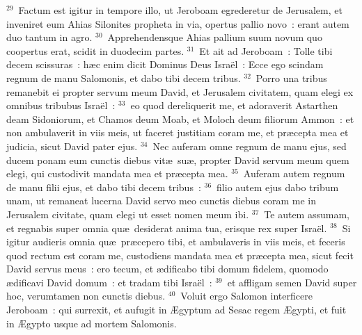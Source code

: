 ${}^{29}$~Factum est igitur in tempore illo, ut Jeroboam egrederetur de Jerusalem, et inveniret eum Ahias Silonites propheta in via, opertus pallio novo~: erant autem duo tantum in agro.
${}^{30}$~Apprehendensque Ahias pallium suum novum quo coopertus erat, scidit in duodecim partes.
${}^{31}$~Et ait ad Jeroboam~: Tolle tibi decem scissuras~: h\ae c enim dicit Dominus Deus Isra\"el~: Ecce ego scindam regnum de manu Salomonis, et dabo tibi decem tribus.
${}^{32}$~Porro una tribus remanebit ei propter servum meum David, et Jerusalem civitatem, quam elegi ex omnibus tribubus Isra\"el~:
${}^{33}$~eo quod dereliquerit me, et adoraverit Astarthen deam Sidoniorum, et Chamos deum Moab, et Moloch deum filiorum Ammon~: et non ambulaverit in viis meis, ut faceret justitiam coram me, et pr\ae cepta mea et judicia, sicut David pater ejus.
${}^{34}$~Nec auferam omne regnum de manu ejus, sed ducem ponam eum cunctis diebus vit\ae\ su\ae , propter David servum meum quem elegi, qui custodivit mandata mea et pr\ae cepta mea.
${}^{35}$~Auferam autem regnum de manu filii ejus, et dabo tibi decem tribus~:
${}^{36}$~filio autem ejus dabo tribum unam, ut remaneat lucerna David servo meo cunctis diebus coram me in Jerusalem civitate, quam elegi ut esset nomen meum ibi.
${}^{37}$~Te autem assumam, et regnabis super omnia qu\ae\ desiderat anima tua, erisque rex super Isra\"el.
${}^{38}$~Si igitur audieris omnia qu\ae\ pr\ae cepero tibi, et ambulaveris in viis meis, et feceris quod rectum est coram me, custodiens mandata mea et pr\ae cepta mea, sicut fecit David servus meus~: ero tecum, et \ae dificabo tibi domum fidelem, quomodo \ae dificavi David domum~: et tradam tibi Isra\"el~:
${}^{39}$~et affligam semen David super hoc, verumtamen non cunctis diebus.
${}^{40}$~Voluit ergo Salomon interficere Jeroboam~: qui surrexit, et aufugit in \AE gyptum ad Sesac regem \AE gypti, et fuit in \AE gypto usque ad mortem Salomonis.


